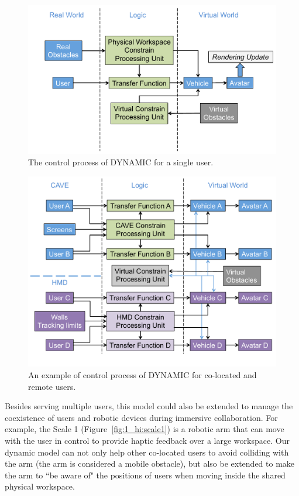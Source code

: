 \begin{figure}[htb]
  \centering
  \includegraphics[width=.9\textwidth]{figures/ch5/process_single}
  \caption{\label{fig:5_process_single}The control process of DYNAMIC for a single user.}
\end{figure}

\begin{figure}[htb]
  \centering
  \includegraphics[width=.9\textwidth]{figures/ch5/process_remote}
  \caption{\label{fig:5_process_remote}An example of control process of DYNAMIC for co-located and remote users.}
\end{figure}

Besides serving multiple users, this model could also be extended to manage the coexistence of users and robotic devices during immersive collaboration. For example, the Scale 1\texttrademark{} (Figure~\ref{fig:1_hi:scale1}) is a robotic arm that can move with the user in control to provide haptic feedback over a large workspace. Our dynamic model can not only help other co-located users to avoid colliding with the arm (the arm is considered a mobile obstacle), but also be extended to make the arm to ``be aware of" the positions of users when moving inside the shared physical workspace.



